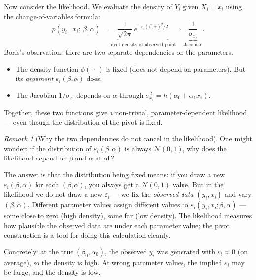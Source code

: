 \documentclass[a4paper,oneside,12pt]{extarticle}
\theoremstyle{plain}
\theoremstyle{definition}
\theoremstyle{remark}
\newtheorem{remark}[proposition]{Remark}
\begin{document}
Now consider the likelihood.  We evaluate the density of $Y_i$ given
$X_i = x_i$ using the change-of-variables formula:
\[
  p(y_i \mid x_i;\,\beta,\alpha)
  = \underbrace{
      \frac{1}{\sqrt{2\pi}}\,e^{-\varepsilon_i(\beta,\alpha)^2/2}
    }_{\text{pivot density at observed point}}
  \;\cdot\;
  \underbrace{\frac{1}{\sigma_{x_i}}}_{\text{Jacobian}}.
\]
Boris's observation: there are two separate dependencies on the
parameters.
\begin{itemize}
\item The density function $\phi(\,\cdot\,)$ is fixed (does not depend
  on parameters).  But its \emph{argument} $\varepsilon_i(\beta,\alpha)$
  does.
\item The Jacobian $1/\sigma_{x_i}$ depends on $\alpha$ through
  $\sigma_{x_i}^2 = h(\alpha_0 + \alpha_1 x_i)$.
\end{itemize}
Together, these two functions give a non-trivial, parameter-dependent
likelihood — even though the distribution of the pivot is fixed.

\begin{remark}[Why the two dependencies do not cancel in the likelihood]
One might wonder: if the distribution of $\varepsilon_i(\beta,\alpha)$
is always $\mathcal{N}(0,1)$, why does the likelihood depend on $\beta$
and $\alpha$ at all?

The answer is that the distribution being fixed means: if you draw a
new $\varepsilon_i(\beta,\alpha)$ for each $(\beta,\alpha)$, you always
get a $\mathcal{N}(0,1)$ value.  But in the likelihood we do not draw
a new $\varepsilon_i$ — we fix the \emph{observed data} $(y_i, x_i)$
and vary $(\beta,\alpha)$.  Different parameter values assign different
values to $\varepsilon_i(y_i, x_i;\beta,\alpha)$ — some close to zero
(high density), some far (low density).  The likelihood measures how
plausible the observed data are under each parameter value; the pivot
construction is a tool for doing this calculation cleanly.

Concretely: at the true $(\beta_0,\alpha_0)$, the observed $y_i$ was
generated with $\varepsilon_i \approx 0$ (on average), so the density
is high.  At wrong parameter values, the implied $\varepsilon_i$ may
be large, and the density is low.
\end{remark}
\end{document}
